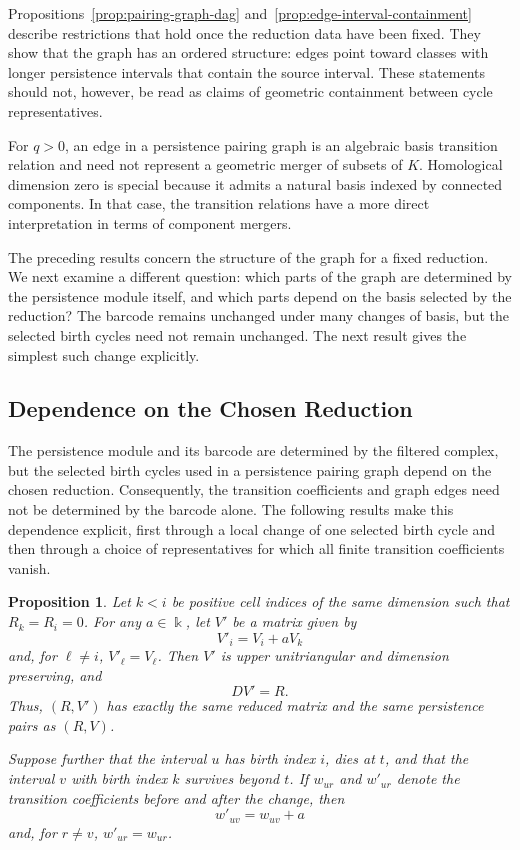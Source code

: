 \documentclass[11pt]{article}
\theoremstyle{paperdefinition}
\theoremstyle{paperplain}
\newtheorem{proposition}[definition]{Proposition}
\theoremstyle{paperremark}
\begin{document}
Propositions~\ref{prop:pairing-graph-dag} and~\ref{prop:edge-interval-containment} describe restrictions that hold once the reduction data have been fixed. They show that the graph has an ordered structure: edges point toward classes with longer persistence intervals that contain the source interval. These statements should not, however, be read as claims of geometric containment between cycle representatives.

For $q>0$, an edge in a persistence pairing graph is an algebraic basis transition relation and need not represent a geometric merger of subsets of $K$. Homological dimension zero is special because it admits a natural basis indexed by connected components. In that case, the transition relations have a more direct interpretation in terms of component mergers.

The preceding results concern the structure of the graph for a fixed reduction. We next examine a different question: which parts of the graph are determined by the persistence module itself, and which parts depend on the basis selected by the reduction? The barcode remains unchanged under many changes of basis, but the selected birth cycles need not remain unchanged. The next result gives the simplest such change explicitly.

\subsection{Dependence on the Chosen Reduction}
\label{subsec:reduction-dependence}

The persistence module and its barcode are determined by the filtered complex, but the selected birth cycles used in a persistence pairing graph depend on the chosen reduction. Consequently, the transition coefficients and graph edges need not be determined by the barcode alone. The following results make this dependence explicit, first through a local change of one selected birth cycle and then through a choice of representatives for which all finite transition coefficients vanish.

\begin{proposition}
\label{prop:birth-cycle-change}
Let $k<i$ be positive cell indices of the same dimension such that $R_k=R_i=0$. For any $a\in\Bbbk$, let $V'$ be a matrix given by
\[
V'_i=V_i+aV_k
\]
and, for $\ell\neq i$, $V'_\ell=V_\ell$. Then $V'$ is upper unitriangular and dimension preserving, and
\[
DV'=R.
\]
Thus, $(R,V')$ has exactly the same reduced matrix and the same persistence pairs as $(R,V)$.

Suppose further that the interval $u$ has birth index $i$, dies at $t$, and that the interval $v$ with birth index $k$ survives beyond $t$. If $w_{ur}$ and $w'_{ur}$ denote the transition coefficients before and after the change, then
\[
w'_{uv}=w_{uv}+a
\]
and, for $r\neq v$, $w'_{ur}=w_{ur}$.
\end{proposition}
\end{document}
